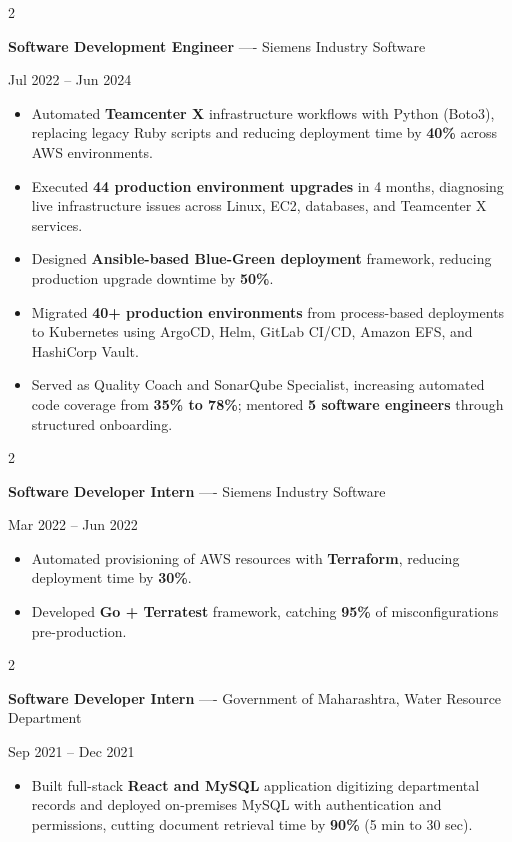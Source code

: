 \documentclass[10pt, letterpaper]{article}
\newenvironment{highlights}{
    \begin{itemize}[
        topsep=0.10 cm,
        parsep=0.06 cm,
        partopsep=0pt,
        itemsep=0.06 cm,
        leftmargin=12pt
    ]
}{
    \end{itemize}
}
\newenvironment{twocolentry}[2][]{
    \onecolentry
    \def\secondColumn{#2}
    \setcolumnwidth{\fill, 4.5 cm}
    \begin{paracol}{2}
}{
    \switchcolumn \raggedleft \secondColumn
    \end{paracol}
    \endonecolentry
}
\begin{document}
\vspace{0.15 cm}

\begin{twocolentry}{Jul 2022 -- Jun 2024}
\textbf{Software Development Engineer} ---- Siemens Industry Software
\end{twocolentry}
\begin{highlights}
  \item Automated \textbf{Teamcenter X} infrastructure workflows with Python (Boto3), replacing legacy Ruby scripts and reducing deployment time by \textbf{40\%} across AWS environments.
  \item Executed \textbf{44 production environment upgrades} in 4 months, diagnosing live infrastructure issues across Linux, EC2, databases, and Teamcenter X services.
  \item Designed \textbf{Ansible-based Blue-Green deployment} framework, reducing production upgrade downtime by \textbf{50\%}.
  \item Migrated \textbf{40+ production environments} from process-based deployments to Kubernetes using ArgoCD, Helm, GitLab CI/CD, Amazon EFS, and HashiCorp Vault.
  \item Served as Quality Coach and SonarQube Specialist, increasing automated code coverage from \textbf{35\% to 78\%}; mentored \textbf{5 software engineers} through structured onboarding.
\end{highlights}

\vspace{0.15 cm}

\begin{twocolentry}{Mar 2022 -- Jun 2022}
\textbf{Software Developer Intern} ---- Siemens Industry Software
\end{twocolentry}
\begin{highlights}
  \item Automated provisioning of AWS resources with \textbf{Terraform}, reducing deployment time by \textbf{30\%}.
  \item Developed \textbf{Go + Terratest} framework, catching \textbf{95\%} of misconfigurations pre-production.
\end{highlights}

\vspace{0.15 cm}

\begin{twocolentry}{Sep 2021 -- Dec 2021}
\textbf{Software Developer Intern} ---- Government of Maharashtra, Water Resource Department
\end{twocolentry}
\begin{highlights}
  \item Built full-stack \textbf{React and MySQL} application digitizing departmental records and deployed on-premises MySQL with authentication and permissions, cutting document retrieval time by \textbf{90\%} (5 min to 30 sec).
\end{highlights}
\end{document}
